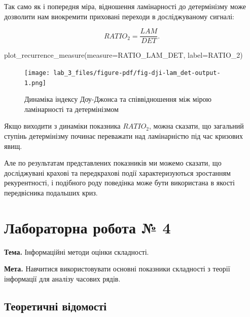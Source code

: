 \documentclass[
  letterpaper,
]{report}
\newenvironment{Shaded}{\begin{snugshade}}{\end{snugshade}}
\newcommand{\NormalTok}[1]{\textcolor[rgb]{0.00,0.23,0.31}{#1}}
\newcommand{\OperatorTok}[1]{\textcolor[rgb]{0.37,0.37,0.37}{#1}}
\newcommand{\StringTok}[1]{\textcolor[rgb]{0.13,0.47,0.30}{#1}}
\begin{document}
Так само як і попередня міра, відношення ламінарності до детермінізму
може дозволити нам виокремити приховані переходи в досліджуваному
сигналі:

\[
RATIO_2=\frac{LAM}{DET}.
\]

\begin{Shaded}
\begin{Highlighting}[]
\NormalTok{plot\_recurrence\_measure(measure}\OperatorTok{=}\NormalTok{RATIO\_LAM\_DET, label}\OperatorTok{=}\StringTok{\textquotesingle{}RATIO\_2\textquotesingle{}}\NormalTok{)}
\end{Highlighting}
\end{Shaded}

\begin{figure}[H]

{\centering \texttt{[image: lab\_3\_files/figure-pdf/fig-dji-lam\_det-output-1.png]}

}

\caption{\label{fig-dji-lam_det}Динаміка індексу Доу-Джонса та
співвідношення між мірою ламінарності та детермінізмом}

\end{figure}

Якщо виходити з динаміки показника \(RATIO_2\), можна сказати, що
загальний ступінь детермінізму починає переважати над ламінарністю під
час кризових явищ.

Але по результатам представлених показників ми можемо сказати, що
досліджувані крахові та передкрахові події характеризуються зростанням
рекурентності, і подібного роду поведінка може бути використана в якості
передвісника подальших криз.


\hypertarget{ux43bux430ux431ux43eux440ux430ux442ux43eux440ux43dux430-ux440ux43eux431ux43eux442ux430-4}{%
\chapter{Лабораторна робота №
4}\label{ux43bux430ux431ux43eux440ux430ux442ux43eux440ux43dux430-ux440ux43eux431ux43eux442ux430-4}}

\textbf{Тема.} Інформаційні методи оцінки складності.

\textbf{Мета.} Навчитися використовувати основні показники складності з
теорії інформації для аналізу часових рядів.

\hypertarget{ux442ux435ux43eux440ux435ux442ux438ux447ux43dux456-ux432ux456ux434ux43eux43cux43eux441ux442ux456-3}{%
\section{Теоретичні
відомості}\label{ux442ux435ux43eux440ux435ux442ux438ux447ux43dux456-ux432ux456ux434ux43eux43cux43eux441ux442ux456-3}}
\end{document}

